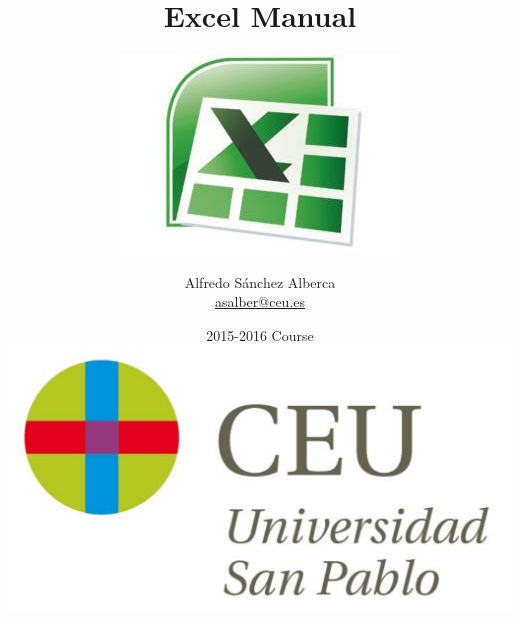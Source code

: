 \title{\vspace{5cm}\fontsize{1.5cm}{2em}\selectfont\color{color1}
Excel Manual}
\subtitle{\includegraphics[scale=0.5]{../img/logo_excel}}
\author{\LARGE\color{color2}Alfredo Sánchez Alberca\\ \url{asalber@ceu.es}}
\date{2015-2016 Course\\[1cm]
\includegraphics[scale=0.3]{../img/logo_uspceu}
}
\maketitle